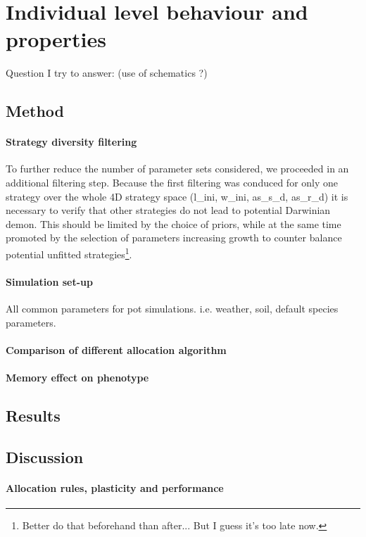 \section{Individual level behaviour and properties}
Question I try to answer: (use of schematics ?)
\subsection{Method}


\paragraph{Strategy diversity filtering}
To further reduce the number of parameter sets considered, we proceeded in an additional filtering step. Because the first filtering was conduced for only one strategy over the whole 4D strategy space (l\_ini,  w\_ini, as\_s\_d, as\_r\_d) it is necessary to verify that other strategies do not lead to potential Darwinian demon. This should be limited by the choice of priors, while at the same time promoted by the selection of parameters increasing growth to counter balance potential unfitted strategies\footnote{Better do that beforehand than after... But I guess it's too late now.}.

\paragraph{Simulation set-up}
All common parameters for pot simulations. i.e. weather, soil, default species parameters.

\paragraph{Comparison of different allocation algorithm}

\paragraph{Memory effect on phenotype}

\subsection{Results}


\subsection{Discussion}
\paragraph{Allocation rules, plasticity and performance}

